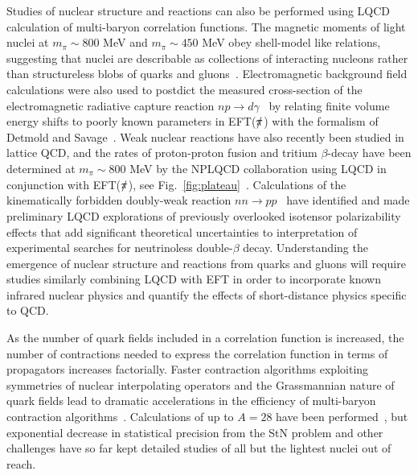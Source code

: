 Studies of nuclear structure and reactions can also be performed using LQCD calculation of multi-baryon correlation functions.
The magnetic moments of light nuclei at $m_\pi \sim 800$ MeV and $m_\pi \sim 450$ MeV obey shell-model like relations, suggesting that nuclei are describable as collections of interacting nucleons rather than structureless blobs of quarks and gluons~\cite{Chang:2015qxa,Detmold:2015daa,Parreno:2016fwu}.
Electromagnetic background field calculations were also used to postdict the measured cross-section of the electromagnetic radiative capture reaction $np\rightarrow d\gamma$~\cite{Beane:2015yha} by relating finite volume energy shifts to poorly known parameters in EFT($\slashed{\pi}$) with the formalism of Detmold and Savage~\cite{Detmold:2004qn}.
Weak nuclear reactions have also recently been studied in lattice QCD, and the rates of proton-proton fusion and tritium $\beta$-decay have been determined at $m_\pi \sim 800$ MeV by the NPLQCD collaboration using LQCD in conjunction with EFT($\slashed{\pi}$), see Fig.~\ref{fig:plateau}~\cite{Savage:2016kon}.
Calculations of the kinematically forbidden doubly-weak reaction $nn\rightarrow pp$~\cite{Shanahan:2017bgi,Tiburzi:2017iux} have identified and made preliminary LQCD explorations of previously overlooked isotensor polarizability effects that add significant theoretical uncertainties to interpretation of experimental searches for neutrinoless double-$\beta$ decay.
Understanding the emergence of nuclear structure and reactions from quarks and gluons will require studies similarly combining LQCD with EFT in order to incorporate known infrared nuclear physics and quantify the effects of short-distance physics specific to QCD.


As the number of quark fields included in a correlation function is increased, the number of contractions needed to express the correlation function in terms of propagators increases factorially.
Faster contraction algorithms exploiting symmetries of nuclear interpolating operators and the Grassmannian nature of quark fields lead to dramatic accelerations in the efficiency of multi-baryon contraction algorithms~\cite{Detmold:2012eu,Doi:2012xd}.
Calculations of up to $A=28$ have been performed~\cite{Detmold:2012eu}, but exponential decrease in statistical precision from the StN problem and other challenges have so far kept detailed studies of all but the lightest nuclei out of reach.


